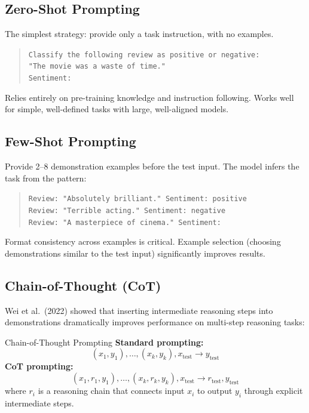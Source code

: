 \subsection{Zero-Shot Prompting}

The simplest strategy: provide only a task instruction, with no examples.
\begin{quote}
\texttt{Classify the following review as positive or negative:}\\
\texttt{"The movie was a waste of time."}\\
\texttt{Sentiment:}
\end{quote}
Relies entirely on pre-training knowledge and instruction following.  Works
well for simple, well-defined tasks with large, well-aligned models.

\subsection{Few-Shot Prompting}

Provide 2--8 demonstration examples before the test input.  The model infers
the task from the pattern:
\begin{quote}
\texttt{Review: "Absolutely brilliant." Sentiment: positive}\\
\texttt{Review: "Terrible acting." Sentiment: negative}\\
\texttt{Review: "A masterpiece of cinema." Sentiment:}
\end{quote}
Format consistency across examples is critical.  Example selection (choosing
demonstrations similar to the test input) significantly improves results.

\subsection{Chain-of-Thought (CoT)}

Wei et al.\ (2022) showed that inserting intermediate reasoning steps into
demonstrations dramatically improves performance on multi-step reasoning
tasks:

\begin{mathresult}{Chain-of-Thought Prompting}
\textbf{Standard prompting:}
\[
(x_1, y_1), \ldots, (x_k, y_k), x_{\text{test}} \to y_{\text{test}}
\]
\textbf{CoT prompting:}
\[
(x_1, r_1, y_1), \ldots, (x_k, r_k, y_k), x_{\text{test}} \to r_{\text{test}}, y_{\text{test}}
\]
where $r_i$ is a reasoning chain that connects input $x_i$ to output $y_i$
through explicit intermediate steps.
\end{mathresult}


